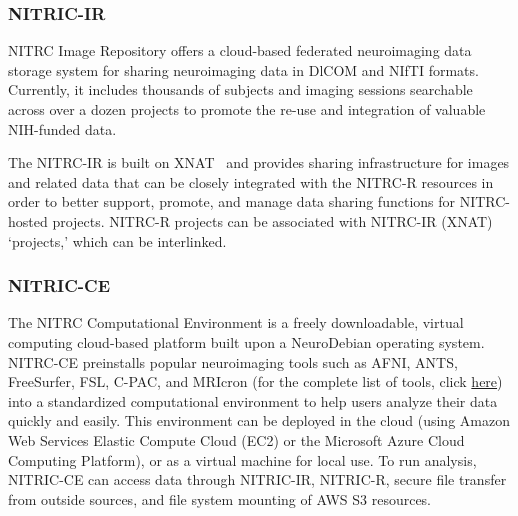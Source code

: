 \subsubsection{NITRIC-IR}

NITRC Image Repository offers a cloud-based federated neuroimaging data storage system for sharing neuroimaging data in DlCOM and NIfTI formats. Currently, it includes thousands of subjects and imaging sessions searchable across over a dozen projects to promote the re-use and integration of valuable NIH-funded data.

The NITRC-IR is built on XNAT~\cite{marcus2007extensible} and provides sharing infrastructure for images and related data that can be closely integrated with the NITRC-R resources in order to better support, promote, and manage data sharing functions for NITRC-hosted projects.
NITRC-R projects can be associated with NITRC-IR (XNAT) ‘projects,’ which can be interlinked. 


\subsubsection{NITRIC-CE}

The NITRC Computational Environment is a freely downloadable, virtual computing cloud-based platform built upon a NeuroDebian operating system. NITRC-CE preinstalls popular neuroimaging tools such as AFNI, ANTS, FreeSurfer, FSL, C-PAC, and MRIcron (for the complete list of tools, click \href{https://www.nitrc.org/plugins/mwiki/index.php/nitrc:User_Guide_-_NITRC-CE_Installed_Packages}{here}) into a standardized computational environment to help users analyze their data quickly and easily. This environment can be deployed in the cloud (using Amazon Web Services Elastic Compute Cloud (EC2) or the Microsoft Azure Cloud Computing Platform), or as a virtual machine for local use. To run analysis, NITRIC-CE can access data through NITRIC-IR, NITRIC-R, secure ﬁle transfer from outside sources, and ﬁle system mounting of AWS S3 resources.


